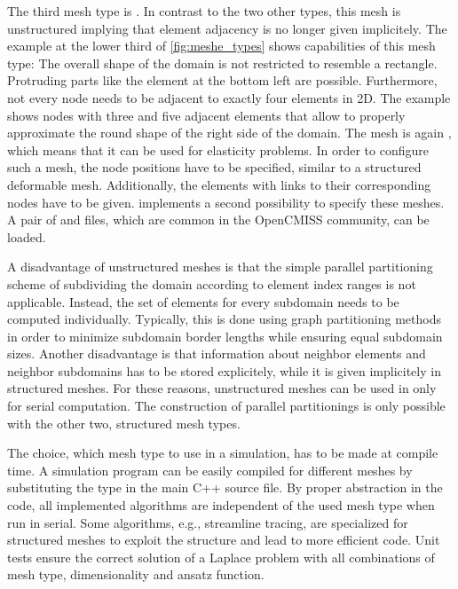 The third mesh type is . In contrast to the two other types, this mesh is unstructured implying that element adjacency is no longer given implicitely.
The example at the lower third of \cref{fig:meshe_types} shows capabilities of this mesh type: The overall shape of the domain is not restricted to resemble a rectangle. Protruding parts like the element at the bottom left are possible. Furthermore, not every node needs to be adjacent to exactly four elements in 2D. The example shows nodes with three and five adjacent elements that allow to properly approximate the round shape of the right side of the domain. The mesh is again , which means that it can be used for elasticity problems.
In order to configure such a mesh, the node positions have to be specified, similar to a structured deformable mesh. Additionally, the elements with links to their corresponding nodes have to be given.
\Opendihu{} implements a second possibility to specify these meshes. A pair of  and  files, which are common in the OpenCMISS community, can be loaded.

A disadvantage of unstructured meshes is that the simple parallel partitioning scheme of subdividing the domain according to element index ranges is not applicable. Instead, the set of elements for every subdomain needs to be computed individually. Typically, this is done using graph partitioning methods in order to minimize subdomain border lengths while ensuring equal subdomain sizes. Another disadvantage is that information about neighbor elements and neighbor subdomains has to be stored explicitely, while it is given implicitely in structured meshes.
For these reasons, unstructured meshes can be used in \opendihu{} only for serial computation. The construction of parallel partitionings is only possible with the other two, structured mesh types.

The choice, which mesh type to use in a simulation, has to be made at compile time. A simulation program can be easily compiled for different meshes by substituting the type in the main C++ source file.
By proper abstraction in the code, all implemented algorithms are independent of the used mesh type when run in serial. Some algorithms, e.g., streamline tracing, are specialized for structured meshes to exploit the structure and lead to more efficient code. Unit tests ensure the correct solution of a Laplace problem with all combinations of mesh type, dimensionality and ansatz function.

